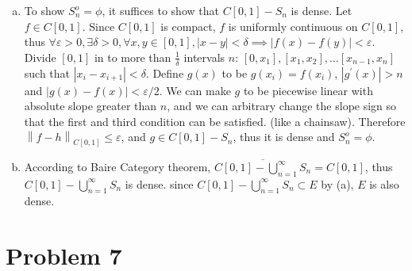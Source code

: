 \documentclass{report}
\def\ve{\varepsilon}
\def\abs#1{\left| #1 \right|}
\begin{document}
\begin{enumerate}[(a)]
    \item 
    To show $S_n^o = \phi$, it suffices to show that $C[0,1] - S_n$ is dense. 
    Let $f \in C[0,1]$.
    Since $C[0,1]$ is compact, $f$ is uniformly continuous on $C[0,1]$, thus 
    $\forall \ve > 0, \exists \delta > 0, \forall x, y \in [0, 1], 
    |x - y| < \delta \implies |f(x) - f(y)| < \ve$.
    Divide $[0,1]$ in to more than $\frac{1}{\delta}$ intervals $n$:
    $[0, x_1], [x_1, x_2], \ldots [x_{n-1}, x_n]$ such that $\abs{x_i - x_{i+1}} < \delta$.
    Define $g(x)$ to be $g(x_i) = f(x_i)$, $|g^\prime(x)| > n$ and $|g(x) - f(x)| < \ve / 2$.
    We can make $g$ to be piecewise linear with absolute slope greater than $n$, 
    and we can arbitrary change the slope sign so that the first and third condition can be satisfied.
    (like a chainsaw).
    Therefore $\left\| f - h\right\|_{C[0,1]}  \le \ve$, and $g \in C[0,1] - S_n$, thus it 
    is dense and $S_n^o = \phi$.

    \item 
    According to Baire Category theorem, $\overline{C[0, 1] - \bigcup_{n=1}^\infty S_n} = C[0,1]$,
    thus $C[0, 1] - \bigcup_{n=1}^\infty S_n$ is dense. since $C[0, 1] - \bigcup_{n=1}^\infty
    S_n \subset E$ by (a), $E$ is also dense.

    \end{enumerate}
    
    \section*{Problem 7}
    
    
\end{document}
